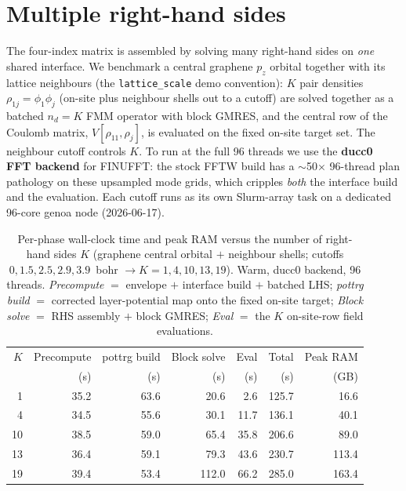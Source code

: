 \documentclass[11pt]{article}
\begin{document}
\section{Multiple right-hand sides}

The four-index matrix is assembled by solving many right-hand sides on
\emph{one} shared interface. We benchmark a central graphene $p_z$ orbital
together with its lattice neighbours (the \texttt{lattice\_scale} demo
convention): $K$ pair densities $\rho_{1j}=\phi_1\phi_j$ (on-site plus
neighbour shells out to a cutoff) are solved together as a batched
$n_d{=}K$ FMM operator with block GMRES, and the central row of the Coulomb
matrix, $V[\rho_{11},\rho_j]$, is evaluated on the fixed on-site target set.
The neighbour cutoff controls $K$. To run at the full 96 threads we use the
\textbf{ducc0 FFT backend} for FINUFFT: the stock FFTW build has a
$\sim$50$\times$ 96-thread plan pathology on these upsampled mode grids, which
cripples \emph{both} the interface build and the evaluation. Each cutoff runs
as its own Slurm-array task on a dedicated 96-core genoa node (2026-06-17).

\begin{table}[h]
\centering
\begin{tabular}{r r r r r r r}
\toprule
$K$ & Precompute & pottrg build & Block solve & Eval & Total & Peak RAM\\
    & (s) & (s) & (s) & (s) & (s) & (GB)\\
\midrule
1  & 35.2 & 63.6 & 20.6  & 2.6  & 125.7 & 16.6\\
4  & 34.5 & 55.6 & 30.1  & 11.7 & 136.1 & 40.1\\
10 & 38.5 & 59.0 & 65.4  & 35.8 & 206.6 & 89.0\\
13 & 36.4 & 59.1 & 79.3  & 43.6 & 230.7 & 113.4\\
19 & 39.4 & 53.4 & 112.0 & 66.2 & 285.0 & 163.4\\
\bottomrule
\end{tabular}
\caption{Per-phase wall-clock time and peak RAM versus the number of
right-hand sides $K$ (graphene central orbital $+$ neighbour shells; cutoffs
$0,1.5,2.5,2.9,3.9$~bohr $\to K=1,4,10,13,19$). Warm, ducc0 backend, 96 threads.
\emph{Precompute} $=$ envelope $+$ interface build $+$ batched LHS;
\emph{pottrg build} $=$ corrected layer-potential map onto the fixed on-site
target; \emph{Block solve} $=$ RHS assembly $+$ block GMRES;
\emph{Eval} $=$ the $K$ on-site-row field evaluations.}
\end{table}
\end{document}
